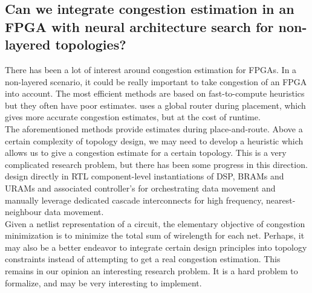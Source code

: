 \subsection{Can we integrate congestion estimation in an FPGA with neural architecture search for non-layered topologies?}
There has been a lot of interest around congestion estimation for FPGAs. In a non-layered scenario, it could be really important to take congestion of an FPGA into account. The most efficient methods are based on fast-to-compute heuristics \cite{Swartz:1998:FRR:275107.275134} but they often have poor estimates. \cite{Yeager2007CongestionEA} uses a global router during placement, which gives more accurate congestion estimates, but at the cost of runtime. \\
The aforementioned methods provide estimates during place-and-route. Above a certain complexity of topology design, we may need to develop a heuristic which allows us to give a congestion estimate for a certain topology. This is a very complicated research problem, but there has been some progress in this direction. \cite{Samajdar2019ScalingTC} design directly in RTL component-level instantiations of DSP, BRAMs and URAMs and associated controller's for orchestrating data movement and manually leverage dedicated cascade interconnects for high frequency, nearest-neighbour data movement. \\
Given a netlist representation of a circuit, the elementary objective of congestion minimization is to minimize the total sum of wirelength for each net. Perhaps, it may also be a better endeavor to integrate certain design principles into topology constraints instead of attempting to get a real congestion estimation. This remains in our opinion an interesting research problem. It is a hard problem to formalize, and may be very interesting to implement. 